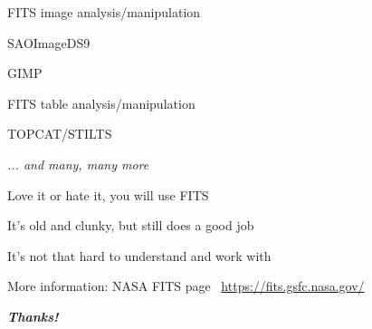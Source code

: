 \documentclass[20pt,landscape]{foils}
\newif\ifrubric
\newcommand{\burl}[1]{{\color{blue}\url{#1}}}
\begin{document}
\begin{list1}
  \item FITS image analysis/manipulation
\vspace*{-0.2cm}
  \begin{list2}
\vspace*{-0.1cm}
    \item SAOImageDS9
\vspace*{-0.1cm}
    \item GIMP
  \end{list2}
\vspace*{-0.2cm}
  \item FITS table analysis/manipulation
\vspace*{-0.2cm}
  \begin{list2}
\vspace*{-0.1cm}
    \item TOPCAT/STILTS
  \end{list2}
\vspace*{-0.2cm}
  \item[] \hspace*{8cm} {\color{darkgrey}\sl ... and many, many more}
\end{list1}


\begin{list1}
  \item Love it or hate it, you will use FITS
  \item It's old and clunky, but still does a good job
  \item It's not that hard to understand and work with
  \item More information: NASA FITS page \ \burl{https://fits.gsfc.nasa.gov/}
\end{list1}

\vspace{6cm}
\begin{center}
  {\color{darkred}\Huge\bf\sl Thanks!}
\end{center}

\label{lastPage}

\ifrubric

\newcommand{\aobSlide}[1]{
\newpage
\rightfooter{}
\MyLogo{}
\begin{picture}(30,0)
  #1
\end{picture}
\bigword{AOB?}
}
\aobSlide{}

\fi
\end{document}
